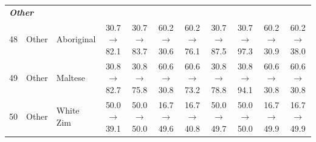 \begin{table}[t]
{\begin{tabular}{rll c c c c c c c c}
\midrule
\multicolumn{11}{l}{\textit{\textbf{Other}}} \\
48 & Other & Aboriginal & 30.7$\rightarrow$82.1 & 30.7$\rightarrow$83.7 & 60.2$\rightarrow$30.6 & 60.2$\rightarrow$76.1 & 30.7$\rightarrow$87.5 & 30.7$\rightarrow$97.3 & 60.2$\rightarrow$30.9 & 60.2$\rightarrow$38.0 \\
49 & Other & Maltese & 30.8$\rightarrow$82.7 & 30.8$\rightarrow$75.8 & 60.6$\rightarrow$30.8 & 60.6$\rightarrow$73.2 & 30.8$\rightarrow$78.8 & 30.8$\rightarrow$94.1 & 60.6$\rightarrow$30.8 & 60.6$\rightarrow$30.8 \\
50 & Other & White Zim & 50.0$\rightarrow$39.1 & 50.0$\rightarrow$50.0 & 16.7$\rightarrow$49.6 & 16.7$\rightarrow$40.8 & 50.0$\rightarrow$49.7 & 50.0$\rightarrow$50.0 & 16.7$\rightarrow$49.9 & 16.7$\rightarrow$49.9 \\
\bottomrule
\end{tabular}
}
\end{table}